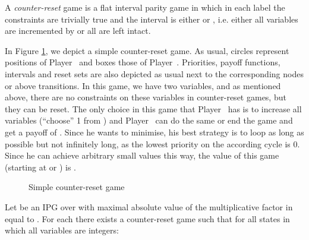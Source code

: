 \documentclass[fleqn,envcountsame]{LMCS}
\newcommand{\ie}{i.e.\xspace}
\newcommand{\pzero}{Player~\xspace}
\newcommand{\pone}{Player~\xspace}
\begin{document}
\begin{defi}
A \emph{counter-reset} game is a flat interval parity game in which
in each label  the constraints  are
trivially true and the interval  is either  or ,
\ie either all variables are incremented by  or all are left intact.
\end{defi}

\begin{exa}
In Figure \ref{counterex}, we depict a simple counter-reset game.
As usual, circles represent positions of \pzero and boxes those of
\pone. Priorities, payoff functions, intervals and reset sets are
also depicted as usual next to the corresponding nodes or above
transitions.
In this game, we have two variables,  and as mentioned
above, there are no constraints on these variables in counter-reset
games, but they can be reset. The only choice in this game that \pzero
has is to increase all variables (``choose'' 1 from ) 
and \pone can do the same
or end the game and get a payoff of . Since he wants to minimise, his
best strategy is to loop as long as possible but not infinitely long, as 
the lowest priority on the according cycle is 0. 
Since he can achieve arbitrary small values this way, the value of this game 
(starting at  or ) is .
\end{exa}

\begin{figure}[h]\label{counterex}
\begin{center}
\end{center}
\caption{Simple counter-reset game}
\end{figure}

\begin{lem} \label{cr_approx}
Let  be an IPG over  with maximal absolute value of 
the multiplicative factor in  equal to . For each 
there exists a counter-reset game  such that for all states 
in which all variables are integers:

\end{lem}
\end{document}
